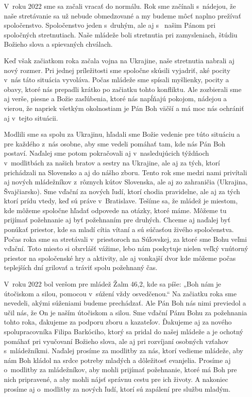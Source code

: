 


V~roku 2022 sme sa začali vracať do normálu. Rok sme začínali s~nádejou, že naše stretávanie sa už nebude obmedzované a my budeme môcť naplno prežívať spoločenstvo. Spoločenstvo jeden s~druhým, ale aj s~ našim Pánom pri spoločných stretnutiach.
Naše mládeže boli stretnutia pri zamysleniach, štúdiu Božieho slova a spievaných chválach.

Keď však začiatkom roka začala vojna na Ukrajine, naše stretnutia nabrali aj nový rozmer. Pri jednej príležitosti sme spoločne skúsili vyjadriť, aké pocity v~nás táto situácia vyvoláva. Počas mládeže sme spísali myšlienky, pocity a obavy, ktoré nás prepadli krátko po začiatku tohto konfliktu. Ale zozbierali sme aj verše, piesne a Božie zasľúbenia, ktoré nás napĺňajú pokojom, nádejou a vierou, že napriek všetkým okolnostiam je Pán Boh väčší a má moc nás ochrániť aj v~tejto situácii.

Modlili sme sa spolu za Ukrajinu, hľadali sme Božie vedenie pre túto situáciu a pre každého z~nás osobne, aby sme vedeli pomáhať tam, kde nás Pán Boh postaví.
Naďalej sme potom pokračovali aj v~nasledujúcich týždňoch v~modlitbách za našich bratov a sestry na Ukrajine, ale aj za tých, ktorí prichádzali na Slovensko a aj do nášho zboru.
Tento rok sme medzi nami privítali aj nových mládežníkov z~rôznych kútov Slovenska, ale aj zo zahraničia (Ukrajina, Švajčiarsko). Sme vďační za nových ľudí, ktorí chodia pravidelne, ale aj za tých ktorí prídu vtedy, keď sú práve v~Bratislave.
Tešíme sa, že mládež je miestom, kde môžeme spoločne hľadať odpovede na otázky, ktoré máme. Môžeme tu prijímať požehnanie aj byť požehnaním pre druhých. Chceme aj naďalej byť ponúkať priestor, kde sa mladí cítia vítaní a sú súčasťou živého spoločenstva.
Počas roka sme sa stretávali v~priestoroch na Súľovskej, za ktoré sme Bohu veľmi vďační. Toto miesto si obzvlášť vážime, lebo nám poskytuje nielen veľký vnútorný priestor na spoločenské hry a aktivity, ale aj vonkajší dvor kde môžeme počas teplejších dní grilovať a tráviť spolu požehnaný čas.

V~roku 2022 bol veršom pre mládež Žalm 46,2, kde sa píše: „Boh nám je útočiskom a silou, pomocou v~súžení vždy osvedčenou.“ Na začiatku roka sme nevedeli, akými súženiami budeme prechádzať. Ale Pán Boh nás nimi previedol a učil nás, že On je naším útočiskom a silou.
Sme vďační Pánu Bohu za požehnania tohto roka, ďakujeme za podporu zboru a kazateľov. Ďakujeme aj za nového spolupracovníka Filipa Barkóciho, ktorý sa pridal do našej mládeže a je ochotný pomáhať pri vyučovaní Božieho slova, ale aj pri rozvíjaní osobných vzťahov s~mládežníkmi.
Naďalej prosíme za modlitby za nás, ktorí vedieme mládeže, aby nám Boh kládol na srdce potreby mladých a dôležitosť evanjelia.
Prosíme aj o~modlitby za mládežníkov, aby mohli prijímať požehnanie, ktoré má Boh pre nich pripravené, a aby mohli nájsť správnu cestu pre ich životy.
A nakoniec prosíme aj o~modlitby za nových ľudí, ktorí sú zapálení pre službu mladým.

